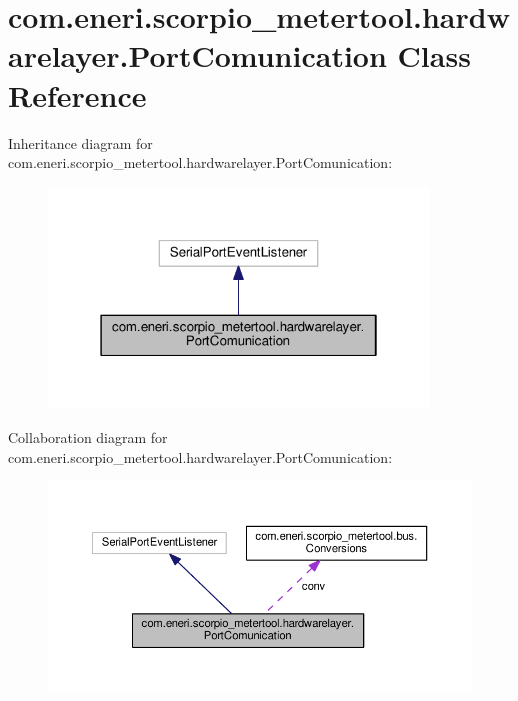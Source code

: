 \hypertarget{classcom_1_1eneri_1_1scorpio__metertool_1_1hardwarelayer_1_1_port_comunication}{}\section{com.\+eneri.\+scorpio\+\_\+metertool.\+hardwarelayer.\+Port\+Comunication Class Reference}
\label{classcom_1_1eneri_1_1scorpio__metertool_1_1hardwarelayer_1_1_port_comunication}


Inheritance diagram for com.\+eneri.\+scorpio\+\_\+metertool.\+hardwarelayer.\+Port\+Comunication\+:
\nopagebreak
\begin{figure}[H]
\begin{center}
\leavevmode
\includegraphics[width=286pt]{classcom_1_1eneri_1_1scorpio__metertool_1_1hardwarelayer_1_1_port_comunication__inherit__graph}
\end{center}
\end{figure}


Collaboration diagram for com.\+eneri.\+scorpio\+\_\+metertool.\+hardwarelayer.\+Port\+Comunication\+:
\nopagebreak
\begin{figure}[H]
\begin{center}
\leavevmode
\includegraphics[width=350pt]{classcom_1_1eneri_1_1scorpio__metertool_1_1hardwarelayer_1_1_port_comunication__coll__graph}
\end{center}
\end{figure}
